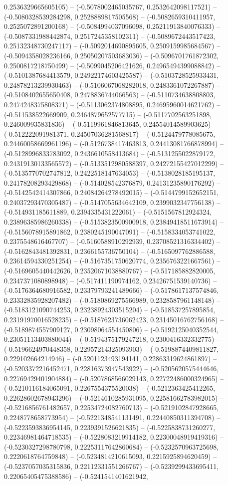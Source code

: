0.2536329665605105) -- (-0.5078002465035767, 0.2532642098117521) -- (-0.5080328539284298, 0.2528889817505568) -- (-0.5082659310411957, 0.2525072891200168) -- (-0.5084994037096098, 0.25211913840076333) -- (-0.5087331988442874, 0.2517245358102311) -- (-0.5089672443517423, 0.25132348730247117) -- (-0.5092014690895605, 0.2509159985684567) -- (-0.5094358028236166, 0.25050207503683036) -- (-0.5096701761872302, 0.2500817218750499) -- (-0.5099045206421626, 0.24965494399088842) -- (-0.5101387684413579, 0.24922174603425587) -- (-0.5103728525933431, 0.24878213239930463) -- (-0.5106067068282018, 0.2483361072267887) -- (-0.5108402655650408, 0.2478836744066563) -- (-0.5110734638808803, 0.2474248375808371) -- (-0.5113062374808895, 0.24695960014621762) -- (-0.511538522669909, 0.2464879652577715) -- (-0.5117702563251898, 0.246009935831836) -- (-0.5119961846813645, 0.24554014589903625) -- (-0.512222091981371, 0.24507036281568817) -- (-0.5124479778085675, 0.24460058669961196) -- (-0.5126738417463813, 0.24413081766878994) -- (-0.5128996833783092, 0.2436610558413684) -- (-0.5131255022879172, 0.24319130133565572) -- (-0.5133512980588397, 0.24272155427012299) -- (-0.5135770702747812, 0.2422518147634053) -- (-0.5138028185195137, 0.24178208293429868) -- (-0.514028542376879, 0.24131235890176292) -- (-0.5142542414307866, 0.24084264278492015) -- (-0.5144799152652151, 0.24037293470305487) -- (-0.5147055634642109, 0.2399032347756138) -- (-0.514931185611889, 0.2394335431222061) -- (-0.5151567812924324, 0.23896385986260338) -- (-0.5153823500900918, 0.23849418511673914) -- (-0.5156078915891862, 0.2380245190047091) -- (-0.5158334053741022, 0.2375548616467707) -- (-0.5160588910292939, 0.23708521316334402) -- (-0.5162843481392831, 0.2366155736750104) -- (-0.5165097762886588, 0.23614594330251254) -- (-0.5167351750620774, 0.2356763221667561) -- (-0.5169605440442626, 0.23520671038880767) -- (-0.517185882820005, 0.2347371080898948) -- (-0.517411190974162, 0.23426751539140736) -- (-0.5176364680916582, 0.23379793241489666) -- (-0.5178617137574846, 0.23332835928207482) -- (-0.5180869275566989, 0.2328587961148148) -- (-0.5183121090744253, 0.23238924303515204) -- (-0.518537257895854, 0.23191970016528235) -- (-0.5187623736062423, 0.23145016762756168) -- (-0.5189874557909127, 0.23098064554450806) -- (-0.5192125040352544, 0.23051113403880044) -- (-0.5194375179247218, 0.2300416332332775) -- (-0.5196624970448358, 0.22957214325093903) -- (-0.5198874409811827, 0.229102664214946) -- (-0.5201123493194141, 0.22863319624861897) -- (-0.5203372216452471, 0.22816373947543922) -- (-0.5205620575444646, 0.22769429401904884) -- (-0.5207868566029143, 0.22722486000324965) -- (-0.5210116184065091, 0.2267554375520038) -- (-0.5212363425412265, 0.22628602678943296) -- (-0.5214610285931095, 0.22581662783982015) -- (-0.5216856761482657, 0.22534724082760713) -- (-0.5219102847928665, 0.2248778658773954) -- (-0.5221348541131491, 0.22440850311394708) -- (-0.5223593836954145, 0.2239391526621835) -- (-0.5225838731260277, 0.22346981464718535) -- (-0.5228083219914182, 0.22300048919419316) -- (-0.5230327298780798, 0.22253117642860684) -- (-0.5232570963725698, 0.2220618764759848) -- (-0.5234814210615093, 0.2215925894620459) -- (-0.5237057035315836, 0.22112331551266767) -- (-0.5239299433695411, 0.22065405475388586) -- (-0.5241541401621942, 